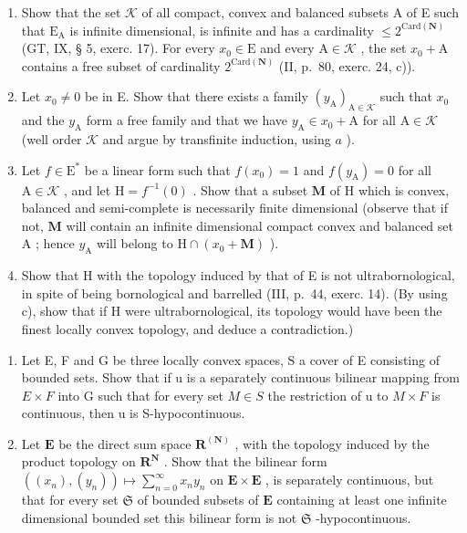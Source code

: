 \begin{enumerate}
\def\labelenumi{\alph{enumi})}
\item
  Show that the set \(\mathcal{K}\) of all compact, convex and balanced subsets A of E such that \(\mathrm{E_A}\) is infinite dimensional, is infinite and has a cardinality \(\leqslant 2^{\mathrm{Card}(\mathbf{N})}\) (GT, IX, § 5, exerc. 17). For every \(x_0 \in \mathrm{E}\) and every \(\mathrm{A} \in \mathcal{K}\) , the set \(x_0 + \mathrm{A}\) contains a free subset of cardinality \(2^{\mathrm{Card}(\mathbf{N})}\) (II, p.~80, exerc. 24, c)).
\item
  Let \(x_0 \neq 0\) be in E. Show that there exists a family \((y_{\mathrm{A}})_{\mathrm{A} \in \mathcal{K}}\) such that \(x_0\) and the \(y_{\mathrm{A}}\) form a free family and that we have \(y_{\mathrm{A}} \in x_0 + \mathrm{A}\) for all \(\mathrm{A} \in \mathcal{K}\) (well order \(\mathcal{K}\) and argue by transfinite induction, using \(a\) ).
\item
  Let \(f \in \mathrm{E}^{*}\) be a linear form such that \(f(x_0) = 1\) and \(f(y_{\mathrm{A}}) = 0\) for all \(\mathrm{A} \in \mathcal{K}\) , and let \(\mathrm{H} = f^{-1}(0)\) . Show that a subset \(\mathbf{M}\) of \(\mathrm{H}\) which is convex, balanced and semi-complete is necessarily finite dimensional (observe that if not, \(\mathbf{M}\) will contain an infinite dimensional compact convex and balanced set \(\mathrm{A}\) ; hence \(y_{\mathrm{A}}\) will belong to \(\mathrm{H} \cap (x_0 + \mathbf{M})\) ).
\item
  Show that H with the topology induced by that of E is not ultrabornological, in spite of being bornological and barrelled (III, p.~44, exerc. 14). (By using c), show that if H were ultrabornological, its topology would have been the finest locally convex topology, and deduce a contradiction.)
\end{enumerate}

\exercisegroup

\begin{enumerate}
\def\labelenumi{\arabic{enumi})}
\item
  Let E, F and G be three locally convex spaces, S a cover of E consisting of bounded sets. Show that if u is a separately continuous bilinear mapping from \(E \times F\) into G such that for every set \(M \in S\) the restriction of u to \(M \times F\) is continuous, then u is S-hypocontinuous.
\item
  Let \(\mathbf{E}\) be the direct sum space \(\mathbf{R}^{(\mathbf{N})}\) , with the topology induced by the product topology on \(\mathbf{R}^{\mathbf{N}}\) . Show that the bilinear form \(((x_n), (y_n)) \mapsto \sum_{n=0}^{\infty} x_n y_n\) on \(\mathbf{E} \times \mathbf{E}\) , is separately continuous, but that for every set \(\mathfrak{S}\) of bounded subsets of \(\mathbf{E}\) containing at least one infinite dimensional bounded set this bilinear form is not \(\mathfrak{S}\) -hypocontinuous.
\end{enumerate}



